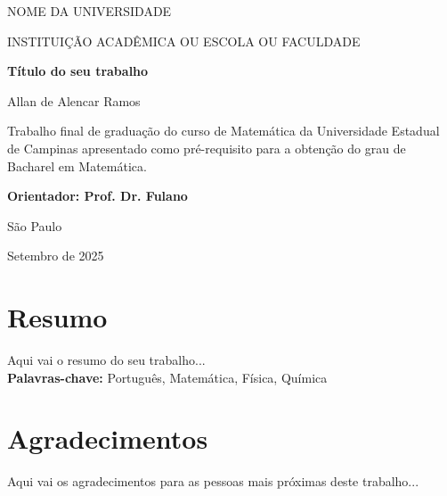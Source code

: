 \documentclass[12pt, a4paper, oneside]{book}
\begin{document}
\begin{titlepage}

\addtolength{\topmargin}{1.5cm}

\setlength{\baselineskip}{1.4\baselineskip}

\begin{center}
\large{NOME DA UNIVERSIDADE}

\large{INSTITUIÇÃO ACADÊMICA OU ESCOLA OU FACULDADE }
\end{center}

\vspace{2cm}

\begin{center}
\Large{\textbf{Título do seu trabalho}}
\end{center}

\vspace{1.5cm}

\begin{center}
\Large{Allan de Alencar Ramos}
\end{center}

\vspace{2cm}

\begin{flushright}
\begin{minipage}{10cm}
\hrulefill

Trabalho final de graduação do curso de Matemática da Universidade Estadual de Campinas apresentado como pré-requisito para a obtenção do grau de Bacharel em Matemática.

\hrulefill

\textbf{Orientador: Prof. Dr. Fulano}

\end{minipage}
\end{flushright}

\setlength{\baselineskip}{0.7\baselineskip}

\vfill

\begin{center}
São Paulo

Setembro de 2025
\end{center}

\end{titlepage}


\chapter*{Resumo}
\noindent
Aqui vai o resumo do seu trabalho... \\
\textbf{Palavras-chave: } Português, Matemática, Física, Química 

\chapter*{Agradecimentos}
\noindent
Aqui vai os agradecimentos para as pessoas mais próximas deste trabalho...
\end{document}
